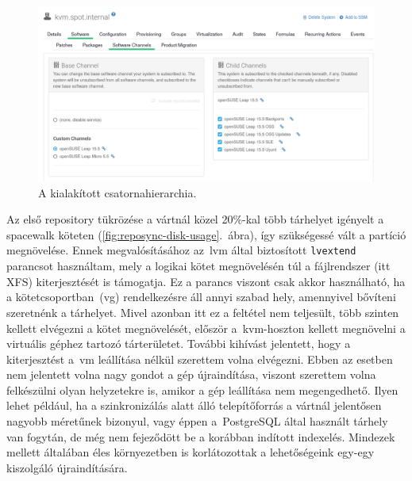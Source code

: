 \begin{figure}[ht]
	\centering
	\includegraphics[width=15cm]{figures/uyuni-channels.png}
	\caption{A kialakított csatornahierarchia.}
	\label{fig:software-channels}
\end{figure}

Az első repository tükrözése a vártnál közel 20\%-kal több tárhelyet igényelt a spacewalk köteten (\ref{fig:reposync-disk-usage}.~ábra), így szükségessé vált a partíció megnövelése. Ennek megvalósításához az~\acrshort{lvm} által biztosított \texttt{lvextend} parancsot használtam, mely a logikai kötet megnövelésén túl a fájlrendszer (itt XFS) kiterjesztését is támogatja. Ez a parancs viszont csak akkor használható, ha a kötetcsoportban~(\acrshort{vg}) rendelkezésre áll annyi szabad hely, amennyivel bővíteni szeretnénk a tárhelyet. Mivel azonban itt ez a feltétel nem teljesült, több szinten kellett elvégezni a kötet megnövelését, először a~\acrshort{kvm}-hoszton kellett megnövelni a virtuális géphez tartozó tárterületet. További kihívást jelentett, hogy a kiterjesztést a~\acrshort{vm} leállítása nélkül szerettem volna elvégezni. Ebben az esetben nem jelentett volna nagy gondot a gép újraindítása, viszont szerettem volna felkészülni olyan helyzetekre is, amikor a gép leállítása nem megengedhető. Ilyen lehet például, ha a szinkronizálás alatt álló telepítőforrás a vártnál jelentősen nagyobb méretűnek bizonyul, vagy éppen a~PostgreSQL által használt tárhely van fogytán, de még nem fejeződött be a korábban indított indexelés. Mindezek mellett általában éles környezetben is korlátozottak a lehetőségeink egy-egy kiszolgáló újraindítására.

